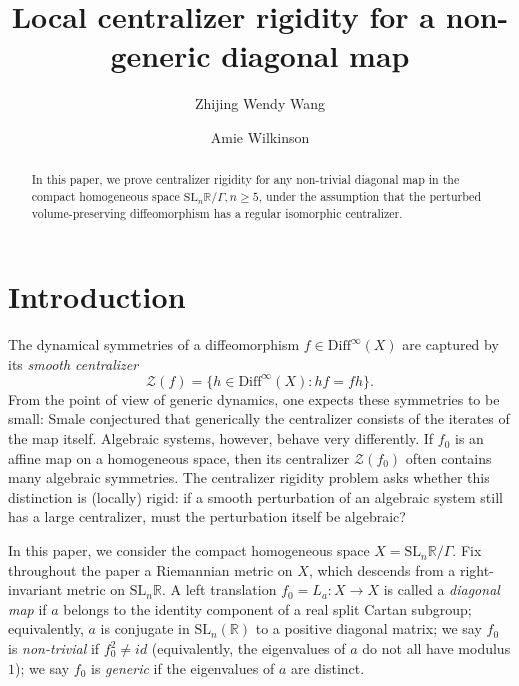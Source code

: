 \documentclass[11pt]{amsart}
\numberwithin{equation}{section}
\newcommand{\R}{\mathbb{R}}
\newcommand{\SL}{\mathrm{SL}}
\theoremstyle{plain}
\begin{document}
\title{Local centralizer rigidity for a non-generic diagonal map}
\author{Zhijing Wendy Wang}
\address{Department of Mathematics, University of Chicago, Chicago, IL 60637, USA}
\author{Amie Wilkinson}
\address{Department of Mathematics, University of Chicago, Chicago, IL 60637, USA}

\begin{abstract}
 In this paper, we prove centralizer rigidity for any non-trivial diagonal map in the compact homogeneous space $\mathrm{SL}_n\R/\Gamma, n\ge 5$, under the assumption that the perturbed volume-preserving diffeomorphism has a regular isomorphic centralizer. 
\end{abstract}

\maketitle
\tableofcontents

\section{Introduction}

The dynamical symmetries of a  diffeomorphism \(f\in \mathrm{Diff}^\infty(X)\) are captured by its
{\em smooth centralizer}
\[
        \mathcal Z(f)
        =
        \{h\in \mathrm{Diff}^\infty(X): hf=fh\}.
\]
From
the point of view of generic dynamics, one expects these symmetries to be
small: Smale \cite{smale} conjectured that generically the centralizer consists of the iterates of the map itself.  Algebraic systems, however, behave very differently.  If
\(f_0\) is an affine map on a homogeneous space, then its centralizer $\mathcal Z(f_0)$ often
contains many algebraic symmetries.  The centralizer rigidity problem asks
whether this distinction is (locally) rigid: if a smooth perturbation of an algebraic
system still has a large centralizer, must the perturbation itself be
algebraic?

In this paper, we consider the compact homogeneous space $X=\mathrm{SL}_n\R/\Gamma$. Fix throughout the paper a Riemannian metric on $X$, which descends from a right-invariant metric on $\mathrm{SL}_n\R$. A left translation $f_0=L_a: X\to X$ is called a {\em diagonal map} if {$a$ belongs to the identity component of a real split Cartan subgroup; equivalently, $a$ is conjugate in $\SL_n(\mathbb R)$ to a positive diagonal matrix}; we say $f_0$ is {\em non-trivial} if $f_0^2\neq id$ (equivalently, the eigenvalues of $a$ do not all have modulus $1 $);  we say $f_0$ is {\em generic} if the eigenvalues of $a$ are distinct.
\end{document}
